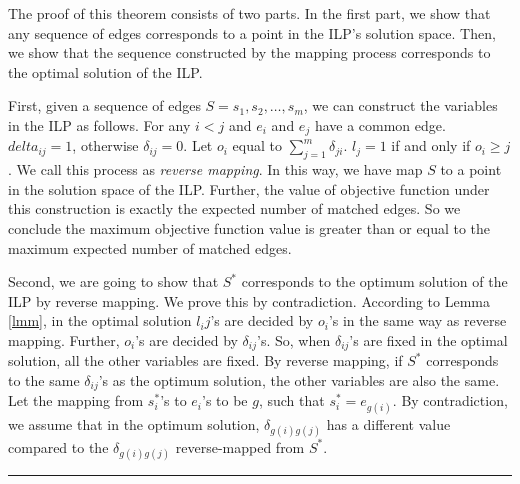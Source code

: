 \documentclass[letterpaper]{article}
\newenvironment{proof}{{Proof:}}{\hfill\rule{2mm}{2mm}}
\begin{document}
\begin{proof}
	The proof of this theorem consists of two parts. In the first part, we show that any sequence of edges corresponds to a point in the ILP's solution space. 
	Then, we show that the sequence constructed by the mapping process corresponds to the optimal solution of the ILP.
	
	First, given a sequence of edges $S=s_1,s_2,\ldots,s_m$, we can construct the variables in the ILP as follows.
	For any $i<j$ and $e_i$ and $e_j$ have a common edge. $delta_{ij}=1$, otherwise $\delta_{ij}=0$.
	Let $o_i$ equal to $\sum_{j=1}^{m}\delta_{ji}$.
	$l_j=1$ if and only if $o_i\geq j$.
	We call this process as \textit{reverse mapping}.
	In this way, we have map $S$ to a point in the solution space of the ILP.
	Further, the value of objective function under this construction is exactly the expected number of matched edges.
	So we conclude the maximum objective function value is greater than or equal to the maximum expected number of matched edges.
	
	Second, we are going to show that $S^*$ corresponds to the optimum solution of the ILP by reverse mapping. 
	We prove this by contradiction. 
	According to Lemma \ref{lmm}, in the optimal solution $l_ij$'s are decided by $o_i$'s in the same way as reverse mapping.
	Further, $o_i$'s are decided by $\delta_{ij}$'s.
	So, when $\delta_{ij}$'s are fixed in  the optimal solution, all the other variables are fixed.
	By reverse mapping, if $S^*$ corresponds to the same $\delta_{ij}$'s as the optimum solution, the other variables are also the same.
	Let the mapping from $s_i^*$'s to $e_i$'s to be $g$, such that $s_i^*=e_{g(i)}$.
	By contradiction, we assume that in the optimum solution, $\delta_{g(i)g(j)}$ has a different value compared to the $\delta_{g(i)g(j)}$ reverse-mapped from $S^*$. 
	
	
	
	
\end{proof}


\newpage


\end{document}
